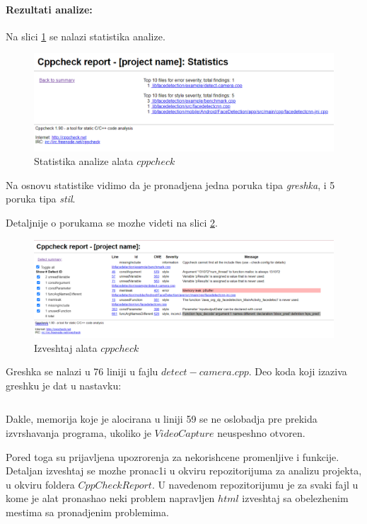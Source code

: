 \documentclass{article}
\begin{document}
\paragraph{Rezultati analize:}
Na slici \ref{stats:cppcheck} se nalazi statistika analize.

\begin{figure}[H]
    \centering
    \includegraphics[width=12cm]{img/cppCheck/cppCheckStats.png}
    \caption{Statistika analize alata $cppcheck$}
    \label{stats:cppcheck}
\end{figure}
Na osnovu statistike vidimo da je pronadjena jedna poruka tipa \textit{greshka}, i 5 poruka tipa \textit{stil}.

Detaljnije o porukama se mozhe videti na slici \ref{html:cppcheck}.
\begin{figure}[H]
    \centering
    \includegraphics[width=12cm]{img/cppCheck/cppChechHtmlReport.png}
    \caption{Izveshtaj alata $cppcheck$}
    \label{html:cppcheck}
\end{figure}

Greshka se nalazi u 76 liniji u fajlu $detect-camera.cpp$. Deo koda koji izaziva greshku je dat u nastavku:
\selectfont

\inputminted[frame=lines,
framesep=2mm,
baselinestretch=1.2,
bgcolor=LightGray,
fontsize=\footnotesize,
firstline=55,
lastline=77,
linenos
]{cpp}{detect-camera.cpp}

\selectfont
Dakle, memorija koje je alocirana u liniji 59 se ne oslobadja pre prekida izvrshavanja programa, ukoliko je $VideoCapture$ neuspeshno otvoren.

Pored toga su prijavljena upozrorenja za nekorishcene promenljive i funkcije. Detaljan izveshtaj se mozhe pronac1i u okviru repozitorijuma za analizu projekta, u okviru foldera $CppCheckReport.$ U navedenom repozitorijumu je za svaki fajl u kome je alat pronashao neki problem napravljen $html$ izveshtaj sa obelezhenim mestima sa pronadjenim problemima.
\end{document}
